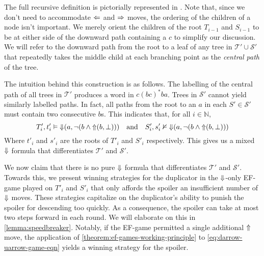 \documentclass[a4paper,UKenglish,cleveref, autoref, thm-restate, numberwithinsect]{lipics-v2021}
\def\Larrow{\ensuremath\mathord{\Leftarrow}}
\def\Rarrow{\ensuremath\mathord{\Rightarrow}}
\def\Uarrow{\ensuremath\mathord{\Uparrow}}
\def\Darrow{\ensuremath\mathord{\Downarrow}}
\begin{document}
The full recursive definition is pictorially represented in . Note that, since we don't need to accommodate $\Larrow$ and $\Rarrow$ moves, the ordering of the children of a node isn't important. We merely orient the children of the root $T_{i - 1}$ and $S_{i - 1}$ to be at either side of the downward path containing a $c$ to simplify our discussion. We will refer to the downward path from the root to a leaf of any tree in $\mathcal{T}' \cup \mathcal{S}'$ that repeatedly takes the middle child at each branching point as the \textit{central path} of the tree.

The intuition behind this construction is as follows. The labelling of the central path of all trees in $\mathcal{T}'$ produces a word in $c (bc)^* ba$. Trees in $\mathcal{S}'$ cannot yield similarly labelled paths. In fact, all paths from the root to an $a$ in each $S' \in \mathcal{S}'$ must contain two consecutive $b$s. This indicates that, for all $i \in \mathbb{N}$,
\begin{equation}
    \label{eq:darrow-uarrow-game-eqn}
    T'_i, t'_i \vDash \Darrow(a, \lnot(b \land \Uarrow(b, \bot))) \quad \text{and} \quad S'_i, s'_i \nvDash \Darrow(a, \lnot(b \land \Uarrow(b, \bot)))
\end{equation}
Where $t'_i$ and $s'_i$ are the roots of $T'_i$ and $S'_i$ respectively. This gives us a mixed $\Darrow$ formula that differentiates $\mathcal{T}'$ and $\mathcal{S}'$.

We now claim that there is no pure $\Darrow$ formula that differentiates $\mathcal{T}'$ and $\mathcal{S}'$. Towards this, we present winning strategies for the duplicator in the $\Darrow$-only EF-game played on $T'_i$ and $S'_i$ that only affords the spoiler an insufficient number of $\Darrow$ moves. These strategies capitalize on the duplicator's ability to punish the spoiler for descending too quickly. As a consequence, the spoiler can take at most two steps forward in each round. We will elaborate on this in \cref{lemma:speedbreaker}. Notably, if the EF-game permitted a single additional $\Uarrow$ move, the application of \cref{theorem:ef-games-working-principle} to \cref{eq:darrow-uarrow-game-eqn} yields a winning strategy for the spoiler.
\end{document}
